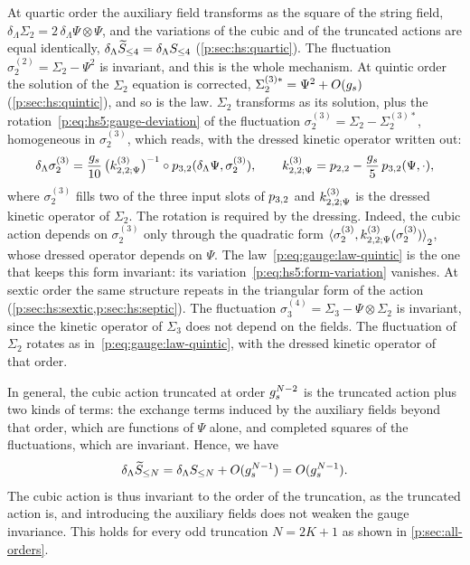 At quartic order the auxiliary field transforms as the square of the string field, $\delta_\Lambda \Sigma_2 = 2 \, \delta_\Lambda \Psi \otimes \Psi$, and the variations of the cubic and of the truncated actions are equal identically, $\delta_\Lambda \caction[\le 4] = \delta_\Lambda S_{\le 4}$ (\cref{p:sec:hs:quartic}).
The fluctuation $\sigma_2^{(2)} = \Sigma_2 - \Psi^2$ is invariant, and this is the whole mechanism.
At quintic order the solution of the $\Sigma_2$ equation is corrected, $\Sigma_2^{(3)*} = \Psi^2 + O(\gs)$ (\cref{p:sec:hs:quintic}), and so is the law.
$\Sigma_2$ transforms as its solution, plus the rotation~\eqref{p:eq:hs5:gauge-deviation} of the fluctuation $\sigma_2^{(3)} = \Sigma_2 - \Sigma_2^{(3)*}$, homogeneous in $\sigma_2^{(3)}$, which reads, with the dressed kinetic operator written out:
\begin{equation}
  \label{p:eq:gauge:law-quintic}
  \delta_\Lambda \sigma_2^{(3)}
    = \frac{\gs}{10} \, \big( \kin{2}{\Psi}{3} \big)^{-1} \circ \sprod{3}{2}(\delta_\Lambda \Psi, \sigma_2^{(3)}),
  \qquad
  \kin{2}{\Psi}{3}
    = \sprod{2}{2} - \frac{\gs}{5} \, \sprod{3}{2}(\Psi, \cdot),
\end{equation}
where $\sigma_2^{(3)}$ fills two of the three input slots of $\sprod{3}{2}$ and $\kin{2}{\Psi}{3}$ is the dressed kinetic operator of $\Sigma_2$.
The rotation is required by the dressing.
  Indeed, the cubic action depends on $\sigma_2^{(3)}$ only through the quadratic form $\pair[2]{\sigma_2^{(3)}}{\kin{2}{\Psi}{3}(\sigma_2^{(3)})}$, whose dressed operator depends on $\Psi$.
  The law~\eqref{p:eq:gauge:law-quintic} is the one that keeps this form invariant: its variation~\eqref{p:eq:hs5:form-variation} vanishes.
At sextic order the same structure repeats in the triangular form of the action (\cref{p:sec:hs:sextic,p:sec:hs:septic}).
The fluctuation $\sigma_3^{(4)} = \Sigma_3 - \Psi \otimes \Sigma_2$ is invariant, since the kinetic operator of $\Sigma_3$ does not depend on the fields.
The fluctuation of $\Sigma_2$ rotates as in~\eqref{p:eq:gauge:law-quintic}, with the dressed kinetic operator of that order.

In general, the cubic action truncated at order $\gs^{N-2}$ is the truncated action plus two kinds of terms: the exchange terms induced by the auxiliary fields beyond that order, which are functions of $\Psi$ alone, and completed squares of the fluctuations, which are invariant.
Hence, we have
\begin{equation}
  \label{p:eq:gauge:invariance-order}
  \delta_\Lambda \caction[\le N]
    = \delta_\Lambda S_{\le N} + O(\gs^{N-1})
    = O(\gs^{N-1}).
\end{equation}
The cubic action is thus invariant to the order of the truncation, as the truncated action is, and introducing the auxiliary fields does not weaken the gauge invariance.
This holds for every odd truncation $N = 2 K + 1$ as shown in \cref{p:sec:all-orders}.

